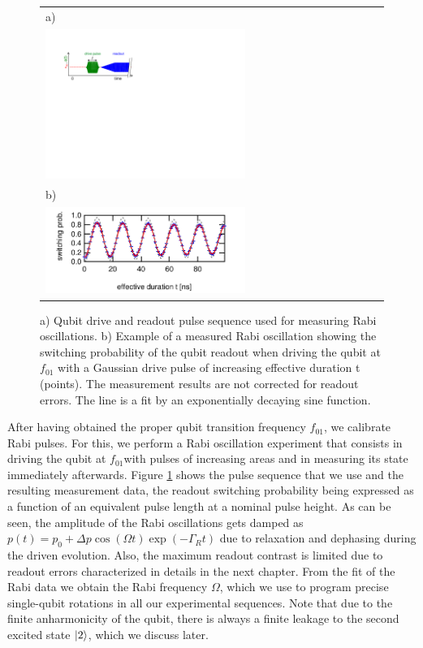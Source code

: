 \begin{figure}[ht!]
\begin{center}
\begin{tabular}{l}
a) \\ \includegraphics[width=0.6\textwidth]{"./material/figures/measurement/qubit_rabi_oscillation"} \\
b) \\ \includegraphics[width=0.6\textwidth]{"./data/ct5/2011_04_21 - grover and tomo/example - qubit 2 rabi"} \\
\end{tabular}
\end{center}
\caption[]{a) Qubit drive and readout pulse sequence used for measuring Rabi oscillations. b) Example of a measured Rabi oscillation showing the switching probability of the qubit readout when driving the qubit at $f_{01}$ with a Gaussian drive pulse of increasing effective duration t (points). The measurement results are not corrected for readout errors. The line is a fit by an exponentially decaying sine function.}
\label{fig:qubit_rabi_example}
\end{figure}

After having obtained the proper qubit transition frequency $f_{01}$, we calibrate Rabi pulses. For this, we  perform a Rabi oscillation experiment that consists in driving the qubit at $f_{01} $with pulses of increasing areas and in measuring its state immediately afterwards. Figure \ref{fig:qubit_rabi_example} shows the pulse sequence that we use and the resulting measurement data, the readout switching probability being expressed as a function of an equivalent pulse length at a nominal pulse height. As can be seen, the amplitude of the Rabi oscillations gets damped as  $p(t)=p_0+{\Delta}p\cos{(\Omega t)}\exp{(-\Gamma_R t)}$ due to relaxation and dephasing during the driven evolution. Also, the maximum readout contrast is limited due to readout errors characterized in details in the next chapter. From the fit of the Rabi data we obtain the Rabi frequency $\Omega$, which we use to program precise single-qubit rotations in all our experimental sequences. Note that due to the finite anharmonicity of the qubit, there is always a finite leakage to the second excited state $\left| 2 \right>$, which we discuss later.

